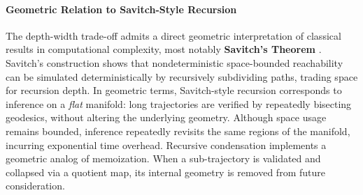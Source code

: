 \documentclass{article}
\newtheorem{theorem}{Theorem}
\begin{document}

 
\paragraph{Geometric Relation to Savitch-Style Recursion}
 
The depth-width trade-off admits a direct geometric interpretation of classical results in computational complexity, most notably \textbf{Savitch’s Theorem} \cite{savitch1970relationships}.
Savitch’s construction shows that nondeterministic space-bounded reachability can be simulated deterministically by recursively subdividing paths, trading space for recursion depth.
In geometric terms, Savitch-style recursion corresponds to inference on a \emph{flat} manifold:
long trajectories are verified by repeatedly bisecting geodesics, without altering the underlying geometry.
Although space usage remains bounded, inference repeatedly revisits the same regions of the manifold, incurring exponential time overhead.
Recursive condensation implements a geometric analog of memoization.
When a sub-trajectory is validated and collapsed via a quotient map, its internal geometry is removed from future consideration.
\end{document}
